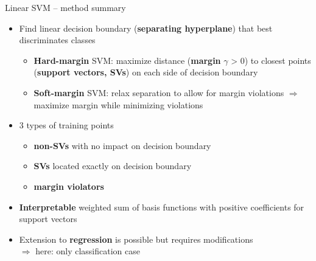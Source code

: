 \begin{vbframe}{Linear SVM -- method summary}

   
\medskip


\begin{itemize}
  \item Find linear decision boundary (\textbf{separating hyperplane}) that 
  best discriminates classes
  \begin{itemize}
    \item \textbf{Hard-margin} SVM: maximize distance (\textbf{margin} 
    $\gamma$ > 0) to closest points (\textbf{support vectors, SVs}) on each 
    side of decision boundary
    \item \textbf{Soft-margin} SVM: relax separation to allow for margin 
    violations $\Rightarrow$ maximize margin while minimizing violations
  \end{itemize}
\end{itemize}

\begin{minipage}{0.7\textwidth}

\begin{itemize}
  \item 3 types of training points
  \begin{itemize}
    \item \textbf{non-SVs} with no impact on decision boundary
    \item \textbf{SVs} located exactly on decision boundary
    \item \textbf{margin violators}
  \end{itemize}
  \item \textbf{Interpretable} weighted sum of basis functions with positive 
  coefficients for support vectors
  \item Extension to \textbf{regression} is possible but requires modifications 
  \\ $\Rightarrow$ here: only classification case
\end{itemize}

\medskip


\end{minipage}
\end{vbframe}
